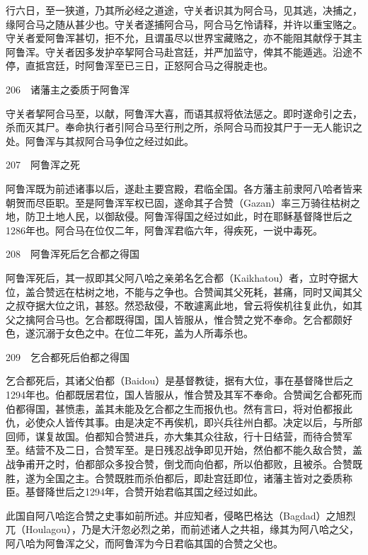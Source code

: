 \documentclass[12pt,UTF8]{ctexbook}
\begin{document}
行六日，至一狭道，乃其所必经之道途，守关者识其为阿合马，见其逃，决捕之，缘阿合马之随从甚少也。守关者遂捕阿合马，阿合马乞怜请释，并许以重宝赂之。守关者爱阿鲁浑甚切，拒不允，且谓虽尽以世界宝藏赂之，亦不能阻其献俘于其主阿鲁浑。守关者因多发护卒挈阿合马赴宫廷，并严加监守，俾其不能遁逃。沿途不停，直抵宫廷，时阿鲁浑至已三日，正怒阿合马之得脱走也。





206　诸藩主之委质于阿鲁浑

守关者挈阿合马至，以献，阿鲁浑大喜，而语其叔将依法惩之。即时遂命引之去，杀而灭其尸。奉命执行者引阿合马至行刑之所，杀阿合马而投其尸于一无人能识之处。阿鲁浑与其叔阿合马争位之经过如此。





207　阿鲁浑之死

阿鲁浑既为前述诸事以后，遂赴主要宫殿，君临全国。各方藩主前隶阿八哈者皆来朝贺而尽臣职。至是阿鲁浑军权已固，遂命其子合赞（Gazan）率三万骑往枯树之地，防卫土地人民，以御敌侵。阿鲁浑得国之经过如此，时在耶稣基督降世后之1286年也。阿合马在位仅二年，阿鲁浑君临六年，得疾死，一说中毒死。





208　阿鲁浑死后乞合都之得国

阿鲁浑死后，其一叔即其父阿八哈之亲弟名乞合都（Kaikhatou）者，立时夺据大位，盖合赞远在枯树之地，不能与之争也。合赞闻其父死耗，甚痛，同时又闻其父之叔夺据大位之讯，甚怒。然恐敌侵，不敢遽离此地，曾云将俟机往复此仇，如其父之擒阿合马也。乞合都既得国，国人皆服从，惟合赞之党不奉命。乞合都颇好色，遂沉溺于女色之中。在位二年死，盖为人所毒杀也。





209　乞合都死后伯都之得国

乞合都死后，其诸父伯都（Baidou）是基督教徒，据有大位，事在基督降世后之1294年也。伯都既居君位，国人皆服从，惟合赞及其军不奉命。合赞闻乞合都死而伯都得国，甚愤恚，盖其未能及乞合都之生而报仇也。然有言曰，将对伯都报此仇，必使众人皆传其事。由是决定不再俟机，即兴兵往州白都。决定以后，与所部回师，谋复故国。伯都知合赞进兵，亦大集其众往敌，行十日结营，而待合赞军至。结营不及二日，合赞军至。是日残忍战争即见开始，然伯都不能久敌合赞，盖战争甫开之时，伯都部众多投合赞，倒戈而向伯都，所以伯都败，且被杀。合赞既胜，遂为全国之主。合赞既胜而杀伯都后，即赴宫廷即位，诸藩主皆对之委质称臣。基督降世后之1294年，合赞开始君临其国之经过如此。

此国自阿八哈迄合赞之史事如前所述。并应知者，侵略巴格达（Bagdad）之旭烈兀（Houlagou），乃是大汗忽必烈之弟，而前述诸人之共祖，缘其为阿八哈之父，阿八哈为阿鲁浑之父，而阿鲁浑为今日君临其国的合赞之父也。
\end{document}
